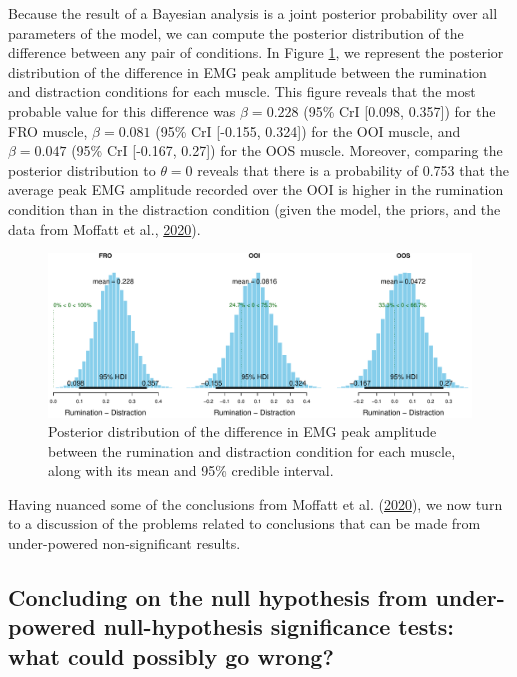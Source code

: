 \documentclass[
  english,
  man, donotrepeattitle,floatsintext]{apa6}
\begin{document}
Because the result of a Bayesian analysis is a joint posterior probability over all parameters of the model, we can compute the posterior distribution of the difference between any pair of conditions. In Figure \ref{fig:posterior}, we represent the posterior distribution of the difference in EMG peak amplitude between the rumination and distraction conditions for each muscle. This figure reveals that the most probable value for this difference was \(\beta = 0.228\) (95\% CrI {[}0.098, 0.357{]}) for the FRO muscle, \(\beta = 0.081\) (95\% CrI {[}-0.155, 0.324{]}) for the OOI muscle, and \(\beta = 0.047\) (95\% CrI {[}-0.167, 0.27{]}) for the OOS muscle. Moreover, comparing the posterior distribution to \(\theta = 0\) reveals that there is a probability of 0.753 that the average peak EMG amplitude recorded over the OOI is higher in the rumination condition than in the distraction condition (given the model, the priors, and the data from Moffatt et al., \protect\hyperlink{ref-moffatt_inner_2020}{2020}).

\begin{figure}[!htb]

{\centering \includegraphics[width=1\linewidth]{manuscript_files/figure-latex/posterior-1} 

}

\caption{Posterior distribution of the difference in EMG peak amplitude between the rumination and distraction condition for each muscle, along with its mean and 95\% credible interval.}\label{fig:posterior}
\end{figure}

Having nuanced some of the conclusions from Moffatt et al. (\protect\hyperlink{ref-moffatt_inner_2020}{2020}), we now turn to a discussion of the problems related to conclusions that can be made from under-powered non-significant results.

\hypertarget{concluding-on-the-null-hypothesis-from-under-powered-null-hypothesis-significance-tests-what-could-possibly-go-wrong}{%
\subsection{Concluding on the null hypothesis from under-powered null-hypothesis significance tests: what could possibly go wrong?}\label{concluding-on-the-null-hypothesis-from-under-powered-null-hypothesis-significance-tests-what-could-possibly-go-wrong}}
\end{document}
